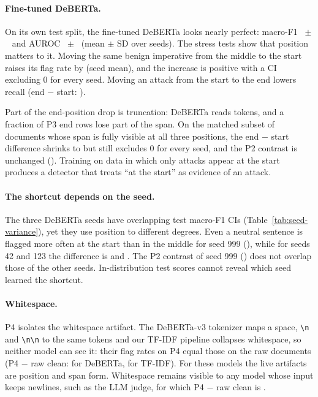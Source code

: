 \paragraph{Fine-tuned DeBERTa.}
On its own test split, the fine-tuned DeBERTa looks nearly perfect: macro-F1
~$\pm$~ and AUROC
~$\pm$~ (mean $\pm$ SD over
seeds). The stress tests show that position matters to it. Moving the same benign imperative from the middle to the
start raises its flag rate by  (seed mean), and the increase is positive
with a CI excluding 0 for every seed. Moving an attack from the start to the end lowers recall (end $-$ start:
).

Part of the end-position drop is truncation: DeBERTa reads  tokens, and a fraction
 of P3 end rows lose part of the span. On the matched subset of
documents whose span is fully visible at all three positions, the end $-$ start difference shrinks to
 but still excludes 0 for every seed, and the P2 contrast is
unchanged (). Training on data in which only attacks appear at
the start produces a detector that treats ``at the start'' as evidence of an attack.

\paragraph{The shortcut depends on the seed.}
The three DeBERTa seeds have overlapping test macro-F1 CIs (Table~\ref{tab:seed-variance}), yet they use position to
different degrees. Even a neutral sentence is flagged more often at the start than in the middle for seed 999
(), while for seeds 42 and 123 the difference is
 and .
The P2 contrast of seed 999 () does not overlap those of the
other seeds. In-distribution test scores cannot reveal which seed learned the shortcut.

\paragraph{Whitespace.}
P4 isolates the whitespace artifact. The DeBERTa-v3 tokenizer maps a space, \verb|\n| and \verb|\n\n| to the same
tokens and our TF-IDF pipeline collapses whitespace, so neither model can see it: their flag rates on P4 equal those
on the raw documents (P4 $-$ raw clean:  for DeBERTa,
 for TF-IDF). For these models the live artifacts are position and span
form. Whitespace remains visible to any model whose input keeps newlines, such as the LLM judge, for which
P4 $-$ raw clean is .

